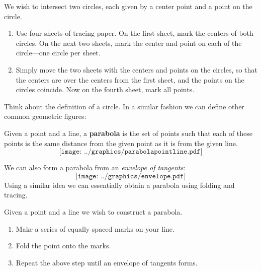 \begin{construction} 
We wish to intersect two circles, each given by a center point and a
point on the circle. 
\begin{enumerate}
\item Use four sheets of tracing paper. On the first sheet, mark the
  centers of both circles. On the next two sheets, mark the center and
  point on each of the circle---one circle per sheet. 
\item Simply move the two sheets with the centers and points on the
  circles, so that the centers are over the centers from the first
  sheet, and the points on the circles coincide. Now on the fourth
  sheet, mark all points.
\end{enumerate}
\end{construction}
\QM


Think about the definition of a circle. In a similar fashion we can
define other common geometric figures:


\begin{definition} 
Given a point and a line, a \textbf{parabola} is the
set of points such that each of these points is the same distance from
the given point as it is from the given line.
\[
\texttt{[image: ../graphics/parabolapointline.pdf]}
\]
\end{definition}


We can also form a parabola from an \textit{envelope of
  tangents}:
\[
\texttt{[image: ../graphics/envelope.pdf]}
\]
Using a similar idea we can essentially obtain a parabola using
folding and tracing.

\begin{construction}[Parabola] 
Given a point and a line we wish to construct a parabola.
\begin{enumerate}
\item Make a series of equally spaced marks on your line. 
\item Fold the point onto the marks.
\item Repeat the above step until an envelope of tangents forms.
\end{enumerate}
\end{construction}

